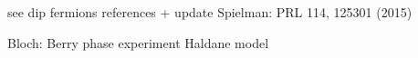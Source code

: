 
see dip fermions references + update
Spielman: PRL 114, 125301 (2015)

\cite{Aidelsburger2011,Aidelsburger2013,Miyake2013}

Bloch: Berry phase experiment
Haldane model \cite{Jotzu2014}




